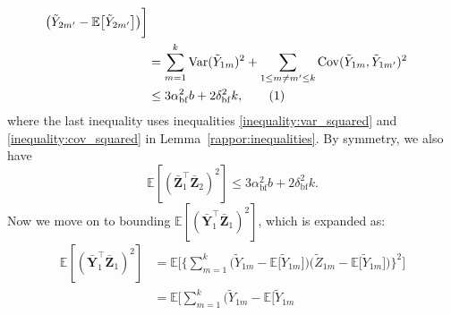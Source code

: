 \documentclass[twoside,11pt]{article}
\newcommand\numberthis{\addtocounter{equation}{1}\tag{\theequation}}
\newcommand{\rvTwo}{Y}
\newcommand{\rvThree}{Z}
\newcommand{\vectorize}[1]{\mathbf{#1}}
\newcommand{\private}[1]{\tilde{#1}}
\newcommand{\mE}{\mathbb{E}} %
\newcommand{\normSqMultinomMax}{b}
\newcommand{\alphabetSize}{k} %
\newcommand{\vectorIndex}{m}
\newcommand{\privacyParameter}{\alpha} %
\newcommand{\privacyParameterrappor}{\privacyParameter_{\mathrm{bf}}}
\newcommand{\smallNumber}{\delta}
\newcommand{\smallNumberrappor}{\smallNumber_{\mathrm{bf}}}
\begin{document}
\begin{appendix}
\begin{align*}
		\bigl( %
		\private{\rvTwo}_{2 \vectorIndex'}
		-
		\mE
		\bigl[
		\private{\rvTwo}_{2 \vectorIndex'}
		\bigr]
		\bigr)%
		\biggr]
		\\&= %
		\sum_{\vectorIndex = 1}^\alphabetSize
		\mathrm{Var}(\private{Y}_{1 \vectorIndex})^2
		+
		\sum_{1 \leq \vectorIndex \neq \vectorIndex' \leq \alphabetSize}
		\mathrm{Cov}(\private{Y}_{1 \vectorIndex}, \private{Y}_{1 \vectorIndex'})^2
		\\&\leq
		3
		\privacyParameterrappor^2
		\normSqMultinomMax
		+
		2
		\smallNumberrappor^2
		\alphabetSize,
		\numberthis
		\label{term:multinomial:upper:rappor_elltwo:EY1Y2:bound}
	\end{align*}
	where the last inequality uses inequalities \eqref{inequality:var_squared} and \eqref{inequality:cov_squared} in Lemma~\ref{rappor:inequalities}. 
	By symmetry, we also have 
	\begin{equation}\label{term:multinomial:upper:rappor_elltwo:EZ1Z2:bound}
		\mE[
		(
		\bar{\vectorize{\rvThree}}_1^\top 
		\bar{\vectorize{\rvThree}}_2
		)^2
		]
		\leq
		3
		\privacyParameterrappor^2
		\normSqMultinomMax
		+
		2
		\smallNumberrappor^2
		\alphabetSize.	
	\end{equation}
	\noindent
	Now we move on to bounding $
	\mE[
	(
	\bar{\vectorize{\rvTwo}}_1^\top
	\bar{\vectorize{\rvThree}}_1)^2]
	$, which is expanded as:
	\begin{align*}
		\mE[
		(
		\bar{\vectorize{\rvTwo}}_1^\top 
		\bar{\vectorize{\rvThree}}_1
		)^2
		]
		&=
		\mE
		\biggl[ %
		\biggl\{%
		\sum_{\vectorIndex = 1}^\alphabetSize %
		\bigl( %
		\private{\rvTwo}_{1 \vectorIndex}
		- %
		\mE
		\bigl[
		\private{\rvTwo}_{1 \vectorIndex}
		\bigr]
		\bigr)%
		\bigl( %
		\private{\rvThree}_{1 \vectorIndex}
		-
		\mE
		\bigl[
		\private{\rvTwo}_{1 \vectorIndex}
		\bigr]
		\bigr)%
		\biggl\}^2 %
		\biggr]
		\\&=
		\mE
		\biggl[ %
		\sum_{\vectorIndex = 1}^\alphabetSize %
		\bigl( %
		\private{\rvTwo}_{1 \vectorIndex}
		- %
		\mE
		\bigl[
		\private{\rvTwo}_{1 \vectorIndex}

\end{align*}
\end{appendix}
\end{document}
